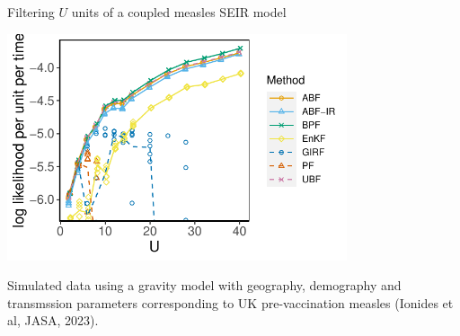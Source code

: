\documentclass{beamer}
\begin{document}
  


    


    


\begin{frame}{Filtering $U$ units of a coupled measles SEIR model}

\vspace{-1mm}

\begin{center}
\includegraphics[width=10cm]{mscale_loglik_plot-1.pdf}


\end{center}

\vspace{-4mm}

Simulated data using a gravity model with geography, demography and transmssion parameters corresponding to UK pre-vaccination measles (Ionides et al, {JASA}, 2023).


\end{frame}
\end{document}
